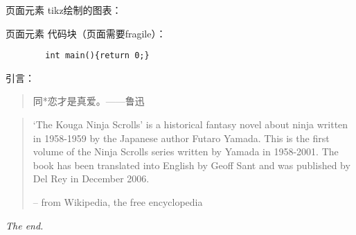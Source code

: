 \documentclass[10pt]{beamer}
\begin{document}
\begin{frame}{页面元素}
    tikz绘制的图表：
    \begin{figure}
    \end{figure}
\end{frame}

\begin{frame}[fragile]{页面元素}
    代码块（页面需要fragile）：
    \begin{verbatim}
        int main(){return 0;}
    \end{verbatim}
    引言：
    \begin{quote}
        同*恋才是真爱。——鲁迅
    \end{quote}
    \begin{quote}
        ‘The Kouga Ninja Scrolls’ is a historical fantasy novel about ninja written in 1958-1959 by the Japanese author Futaro Yamada. This is the first volume of the Ninja Scrolls series written by Yamada in 1958-2001. The book has been translated into English by Geoff Sant and was published by Del Rey in December 2006.
        \begin{flushright}
            -- from Wikipedia, the free encyclopedia
        \end{flushright}
    \end{quote}
\end{frame}

\begin{frame}[standout]
    \textsl{The end.}
\end{frame}
\end{document}
